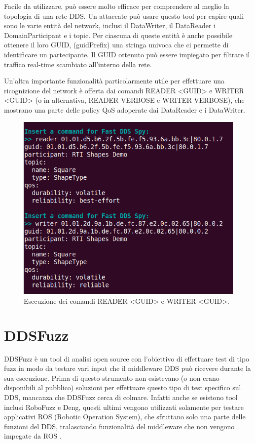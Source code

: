 Facile da utilizzare, può essere molto efficace per comprendere 
al meglio la topologia di una rete DDS. Un attaccate può usare questo 
tool per capire quali sono le varie entità del network, 
inclusi il DataWriter, il DataReader i DomainParticipant e i topic.
Per ciascuna di queste entità è anche possibile ottenere 
il loro GUID, (guidPrefix)
una stringa univoca che ci permette di identificare un partecipante.
Il GUID ottenuto può essere impiegato 
per filtrare il traffico 
real-time scambiato
all'interno della rete.

Un'altra importante funzionalità particolarmente utile per effettuare
una ricognizione del
network è offerta dai
comandi READER <GUID> e WRITER <GUID> (o in alternativa,
READER VERBOSE e WRITER VERBOSE), che mostrano
una parte delle policy QoS adoperate dai DataReader e i DataWriter.

\begin{figure}[H]
    \centering
    \includegraphics[width=12cm, keepaspectratio]{img/fastddsspyQoS.png}
    \caption{Esecuzione dei comandi READER <GUID> e WRITER <GUID>.}
    \label{fastddsspyQoS}
\end{figure}

\section{DDSFuzz}
DDSFuzz è un tool di analisi open source con l'obiettivo di 
effettuare test di tipo fuzz
in modo da testare vari input che il middleware DDS può
ricevere durante la sua esecuzione. Prima di questo strumento 
non esistevano (o non erano disponibili al pubblico) soluzioni
per effettuare questo tipo di test specifico sul DDS, mancanza
che DDSFuzz cerca di colmare. Infatti anche se esistono tool 
inclusi RoboFuzz e Deng, questi ultimi vengono utilizzati solamente
per testare applicativi ROS (Robotic Operation System), che 
sfruttano solo una parte delle funzioni del DDS, tralasciando
funzionalità del middleware che non vengono impegate
da ROS \cite{10.1145/3691620.3695073}.


